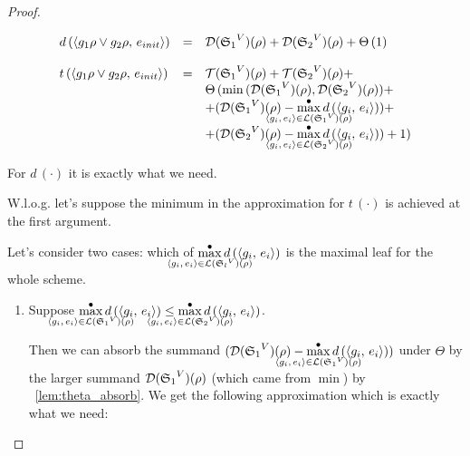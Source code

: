 \begin{proof}
\begin{enumerate}
\begin{enumerate}
	 \[ \begin{array}{lcl}
	d\,(\taskst{\disjgoal{g_1 \rho}{g_2 \rho}}{e_{init}}) &=& \mathcal{D}(\schemewithvset{\mathfrak{S}_1}{V})(\rho) + \mathcal{D}(\schemewithvset{\mathfrak{S}_2}{V})(\rho) + \Theta\,(1) \\
	\\
	t\,(\taskst{\disjgoal{g_1 \rho}{g_2 \rho}}{e_{init}}) &=& \mathcal{T}(\schemewithvset{\mathfrak{S}_1}{V})(\rho) + \mathcal{T}(\schemewithvset{\mathfrak{S}_2}{V})(\rho) + \\
	& & \Theta\,(\min\,(\mathcal{D}(\schemewithvset{\mathfrak{S}_1}{V})(\rho), \mathcal{D}(\schemewithvset{\mathfrak{S}_2}{V})(\rho)) + \\
	& & + (\mathcal{D}(\schemewithvset{\mathfrak{S}_1}{V})(\rho) - \smashoperator{\maxd\limits_{\taskst{g_i}{e_i} \in \mathcal{L}(\schemewithvset{\mathfrak{S}_1}{V})(\rho)}} d\,(\taskst{g_i}{e_i})) + \\
	& & + (\mathcal{D}(\schemewithvset{\mathfrak{S}_2}{V})(\rho) - \smashoperator{\maxd\limits_{\taskst{g_i}{e_i} \in \mathcal{L}(\schemewithvset{\mathfrak{S}_2}{V})(\rho)}} d\,(\taskst{g_i}{e_i})) + 1) \\
	\end{array} \]
	
	For $d\,(\cdot)$ it is exactly what we need. 
   
   	W.l.o.g. let's suppose the minimum in the approximation for $t\,(\cdot)$ is achieved at the first argument.
   
   	Let's consider two cases: which of $\smashoperator{\maxd\limits_{\taskst{g_i}{e_i}  \in \mathcal{L}(\schemewithvset{\mathfrak{S}_l}{V})(\rho)}}d\,(\taskst{g_i}{e_i})$ is the maximal leaf for the whole scheme.
   
   		\begin{enumerate}
   		\item Suppose $\smashoperator{\maxd\limits_{\taskst{g_i}{e_i} \in \mathcal{L}(\schemewithvset{\mathfrak{S}_1}{V})(\rho)}} d\,(\taskst{g_i}{e_i}) \le \smashoperator{\maxd\limits_{\taskst{g_i}{e_i} \in \mathcal{L}(\schemewithvset{\mathfrak{S}_2}{V})(\rho)}} d\,(\taskst{g_i}{e_i})$.
   		
   		Then we can absorb the summand $(\mathcal{D}(\schemewithvset{\mathfrak{S}_1}{V})(\rho) - \smashoperator{\maxd\limits_{\taskst{g_i}{e_i} \in \mathcal{L}(\schemewithvset{\mathfrak{S}_1}{V})(\rho)}} d\,(\taskst{g_i}{e_i}))$ under $\Theta$ by the larger summand $\mathcal{D}({\mathfrak{S}_1}^{V})(\rho)$ (which came from $\min$) by \lemmaword~\ref{lem:theta_absorb}. We get the following approximation which is exactly what we need:
   		

\end{enumerate}
\end{enumerate}
\end{enumerate}
\end{proof}
